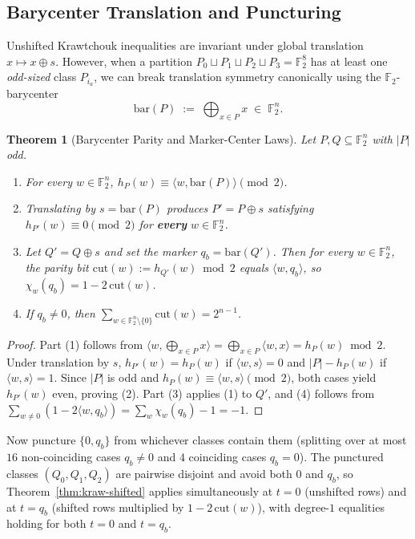 \documentclass[11pt]{article}
\newtheorem{theorem}{Theorem}[section]
\theoremstyle{definition}
\newcommand{\F}{\mathbb{F}}
\begin{document}
\subsection{Barycenter Translation and Puncturing}
\label{sec:barycenter}

Unshifted Krawtchouk inequalities are invariant under global translation $x \mapsto x \oplus s$.
However, when a partition $P_0 \sqcup P_1 \sqcup P_2 \sqcup P_3 = \F_2^8$ has at least one \emph{odd-sized} class $P_{i_a}$, we can break translation symmetry canonically using the $\F_2$-barycenter
\[
  \mathrm{bar}(P) \;:=\; \bigoplus_{x \in P} x \;\in\; \F_2^n.
\]

\begin{theorem}[Barycenter Parity and Marker-Center Laws]
\label{thm:barycenter}
Let $P, Q \subseteq \F_2^n$ with $|P|$ odd.
\begin{enumerate}[nosep]
  \item For every $w \in \F_2^n$, $h_P(w) \equiv \langle w, \mathrm{bar}(P) \rangle \pmod 2$.
  \item Translating by $s = \mathrm{bar}(P)$ produces $P' = P \oplus s$ satisfying $h_{P'}(w) \equiv 0 \pmod 2$ for \textbf{every} $w \in \F_2^n$.
  \item Let $Q' = Q \oplus s$ and set the marker $q_b = \mathrm{bar}(Q')$. Then for every $w \in \F_2^n$, the parity bit $\mathrm{cut}(w) := h_{Q'}(w) \bmod 2$ equals $\langle w, q_b \rangle$, so $\chi_w(q_b) = 1 - 2\,\mathrm{cut}(w)$.
  \item If $q_b \neq 0$, then $\sum_{w \in \F_2^n \setminus \{0\}} \mathrm{cut}(w) = 2^{n-1}$.
\end{enumerate}
\end{theorem}
\begin{proof}
Part (1) follows from $\langle w, \bigoplus_{x \in P} x \rangle = \bigoplus_{x \in P} \langle w, x \rangle = h_P(w) \bmod 2$.
Under translation by $s$, $h_{P'}(w) = h_P(w)$ if $\langle w, s \rangle = 0$ and $|P| - h_P(w)$ if $\langle w, s \rangle = 1$. Since $|P|$ is odd and $h_P(w) \equiv \langle w, s \rangle \pmod 2$, both cases yield $h_{P'}(w)$ even, proving (2).
Part (3) applies (1) to $Q'$, and (4) follows from $\sum_{w \neq 0} (1 - 2\langle w, q_b \rangle) = \sum_{w} \chi_w(q_b) - 1 = -1$.
\end{proof}

Now puncture $\{0, q_b\}$ from whichever classes contain them (splitting over at most $16$ non-coinciding cases $q_b \neq 0$ and $4$ coinciding cases $q_b = 0$). The punctured classes $(Q_0, Q_1, Q_2)$ are pairwise disjoint and avoid both $0$ and $q_b$, so Theorem~\ref{thm:kraw-shifted} applies simultaneously at $t = 0$ (unshifted rows) and at $t = q_b$ (shifted rows multiplied by $1 - 2\,\mathrm{cut}(w)$), with degree-$1$ equalities holding for both $t = 0$ and $t = q_b$.
\end{document}
